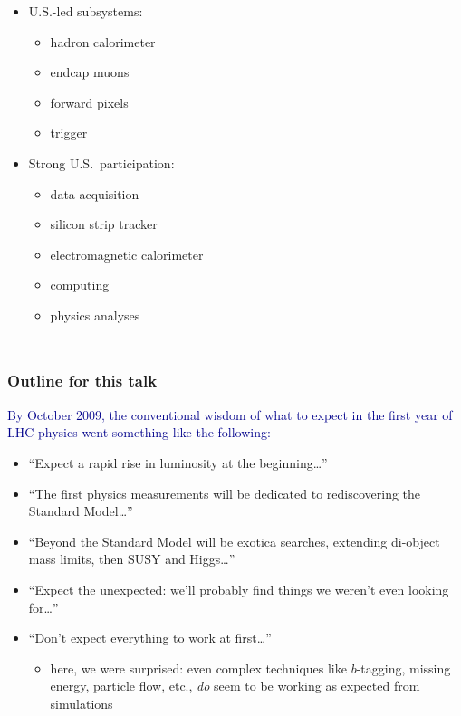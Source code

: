 \documentclass[compress]{beamer}
\begin{document}
\begin{frame}
\begin{columns}
\begin{itemize}
\item U.S.-led subsystems:

\vspace{-0.3 cm}
\begin{itemize}
\item hadron calorimeter
\item endcap muons
\item forward pixels
\item trigger
\end{itemize}

\item Strong U.S.\ participation:

\vspace{-0.3 cm}
\begin{itemize}
\item data acquisition
\item silicon strip tracker
\item electromagnetic calorimeter
\item computing
\item physics analyses
\end{itemize}
\end{itemize}
\end{columns}
\end{frame}

\begin{frame}
\frametitle{Outline for this talk}

\textcolor{darkblue}{\normalsize By October 2009, the conventional wisdom
  of what to expect in the first year of LHC physics went something
  like the following:}

\begin{itemize}\setlength{\itemsep}{0.3 cm}
\item<1-> ``Expect a rapid rise in luminosity at the beginning\ldots''

\item<2-> ``The first physics measurements will be dedicated to
  rediscovering the Standard Model\ldots''

\item<3-> ``Beyond the Standard Model will be exotica searches,
  extending di-object mass limits, then SUSY and Higgs\ldots''

\item<4-> ``Expect the unexpected: we'll probably find things we
  weren't even looking for\ldots''

\item<5-> ``Don't expect everything to work at first\ldots''
\begin{itemize}
\item here, we were surprised: even complex techniques like
  $b$-tagging, missing energy, particle flow, etc., {\it do} seem to
  be working as expected from simulations
\end{itemize}
\end{itemize}
\end{frame}
\end{document}
